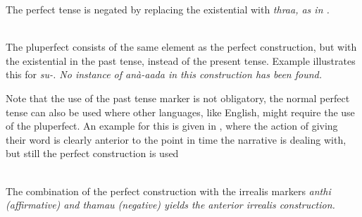 The perfect tense is negated by replacing the existential with \em thraa\em, as in .

 

 \\
The pluperfect consists of the same element as the perfect construction, but with the existential in the past tense, instead of the present tense. Example     illustrates this for \em su-\em. No instance of \em anà-aada \em in this construction has been found.





Note that the use of the past tense marker is not obligatory, the normal perfect tense can also be used where other languages, like English, might require the use of the pluperfect. An example for this is given in , where the action of giving their word is clearly anterior to the point in time the narrative is dealing with, but still the perfect construction is used

 \\


The combination of the perfect construction with the irrealis markers \em anthi \em (affirmative)  and \em thamau \em (negative)  yields the anterior irrealis construction.


